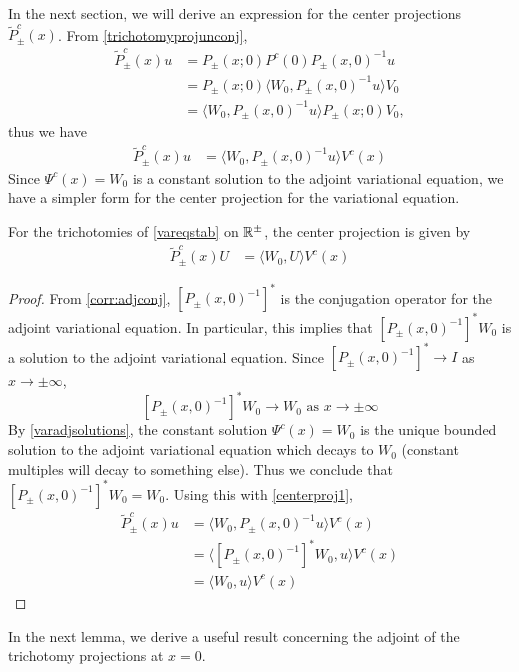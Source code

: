 \documentclass[thesis.tex]{subfiles}
\begin{document}
In the next section, we will derive an expression for the center projections $\tilde{P}^c_\pm(x)$. From \cref{trichotomyprojunconj},
\begin{align*}
\tilde{P}^c_\pm(x) u &= P_\pm(x; 0) P^c(0) P_\pm(x, 0)^{-1} u \\
&= P_\pm(x; 0) \langle W_0, P_\pm(x, 0)^{-1} u \rangle V_0 \\
&= \langle W_0, P_\pm(x, 0)^{-1} u \rangle P_\pm(x; 0) V_0,
\end{align*}
thus we have
\begin{align}\label{centerproj1}
\tilde{P}^c_\pm(x) u 
&= \langle W_0, P_\pm(x, 0)^{-1} u \rangle V^c(x)
\end{align}
Since $\Psi^c(x) = W_0$ is a constant solution to the adjoint variational equation, we have a simpler form for the center projection for the variational equation. 

\begin{lemma}\label{centerprojlemma}
For the trichotomies of \cref{vareqstab} on $\mathbb{R}^\pm$, the center projection is given by 
\begin{align}\label{centerproj}
\tilde{P}^c_\pm(x) U &= \langle W_0, U \rangle V^c(x)
\end{align}
\begin{proof}
From \cref{corr:adjconj}, $[P_\pm(x, 0)^{-1}]^*$ is the conjugation operator for the adjoint variational equation. In particular, this implies that $[P_\pm(x, 0)^{-1}]^* W_0$ is a solution to the adjoint variational equation. Since $[P_\pm(x, 0)^{-1}]^* \rightarrow I$ as $x \rightarrow \pm \infty$, 
\[
[P_\pm(x, 0)^{-1}]^* W_0 \rightarrow W_0 \text{ as }x \rightarrow \pm \infty
\]
By \cref{varadjsolutions}, the constant solution $\Psi^c(x) = W_0$ is the unique bounded solution to the adjoint variational equation which decays to $W_0$ (constant multiples will decay to something else). Thus we conclude that $[P_\pm(x, 0)^{-1}]^* W_0 = W_0$. Using this with \cref{centerproj1},
\begin{align*}
\tilde{P}^c_\pm(x) u 
&= \langle W_0, P_\pm(x, 0)^{-1} u \rangle V^c(x) \\
&= \langle [P_\pm(x, 0)^{-1}]^*W_0, u \rangle V^c(x) \\
&= \langle W_0, u \rangle V^c(x) 
\end{align*}
\end{proof}
\end{lemma}

In the next lemma, we derive a useful result concerning the adjoint of the trichotomy projections at $x = 0$.
\end{document}
